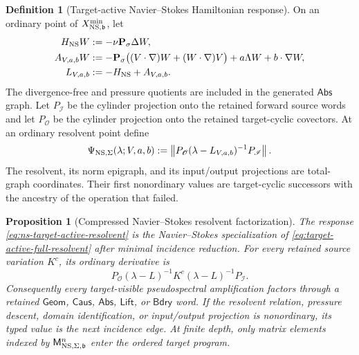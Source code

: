 \documentclass[11pt]{article}
\numberwithin{section}{part}
\theoremstyle{plain}
\newtheorem{proposition}[proposition]{Proposition}
\theoremstyle{definition}
\newtheorem{definition}[definition]{Definition}
\theoremstyle{remark}
\newcommand{\Geom}{\mathsf{Geom}}
\newcommand{\Caus}{\mathsf{Caus}}
\newcommand{\Abs}{\mathsf{Abs}}
\newcommand{\Lift}{\mathsf{Lift}}
\newcommand{\Bdry}{\mathsf{Bdry}}
\begin{document}
\begin{definition}[Target-active Navier--Stokes Hamiltonian response]
\label{def:ns-target-active-hamiltonian-response}
On an ordinary point of
\(X^{\min}_{{\rm NS},\mathfrak b}\), let
\begin{align}
 H_{\rm NS}W&:=-\nu\mathbf P_\sigma\Delta W,
 \label{eq:ns-target-hamiltonian}\\
 A_{V,a,b}W
 &:=-\mathbf P_\sigma\bigl((V\cdot\nabla)W+(W\cdot\nabla)V\bigr)
   +a\Lambda W+b\cdot\nabla W,
 \label{eq:ns-target-directed-linearization}\\
 L_{V,a,b}&:=-H_{\rm NS}+A_{V,a,b}.
 \label{eq:ns-target-linearized-generator}
\end{align}
The divergence-free and pressure quotients are included in the generated
\(\Abs\) graph.  Let \(P_{\mathscr I}\) be the cylinder projection onto the
retained forward source words and let \(P_{\mathscr O}\) be the cylinder
projection onto the retained target-cyclic covectors.  At an ordinary
resolvent point define
\begin{equation}
 \label{eq:ns-target-active-resolvent}
 \Psi_{{\rm NS},\Sigma}(\lambda;V,a,b)
 :=\left\|P_{\mathscr O}
       (\lambda-L_{V,a,b})^{-1}P_{\mathscr I}\right\|.
\end{equation}
The resolvent, its norm epigraph, and its input/output projections are
total-graph coordinates.  Their first nonordinary values are target-cyclic
successors with the ancestry of the operation that failed.
\end{definition}

\begin{proposition}[Compressed Navier--Stokes resolvent factorization]
\label{prop:ns-compressed-resolvent-factorization}
The response \eqref{eq:ns-target-active-resolvent} is the Navier--Stokes
specialization of \eqref{eq:target-active-full-resolvent} after minimal
incidence reduction.  For every retained source variation \(K^c\), its
ordinary derivative is
\begin{equation}
 \label{eq:ns-resolvent-source-factorization}
 P_{\mathscr O}(\lambda-L)^{-1}
 K^c(\lambda-L)^{-1}P_{\mathscr I}.
\end{equation}
Consequently every target-visible pseudospectral amplification factors
through a retained \(\Geom\), \(\Caus\), \(\Abs\), \(\Lift\), or \(\Bdry\)
word.  If the resolvent relation, pressure descent, domain identification, or
input/output projection is nonordinary, its typed value is the next incidence
edge.  At finite depth, only matrix elements indexed by
\(\mathsf M^n_{{\rm NS},\Sigma,\mathfrak b}\) enter the ordered target
program.
\end{proposition}
\end{document}
